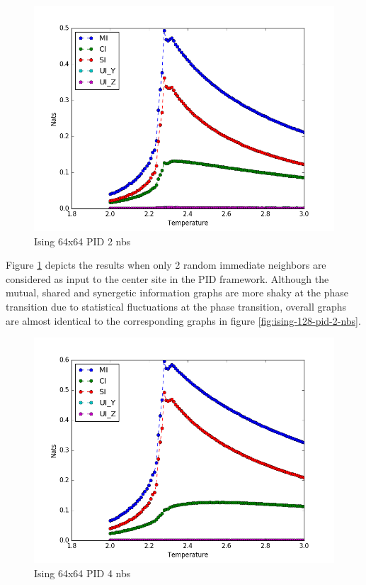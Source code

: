 \documentclass[12pt]{article}
\begin{document}
\begin{figure} [h!]
\begin{center}
\includegraphics[width=\textwidth]{ising-64-pid-2-nbs}
\caption{Ising 64x64 PID 2 nbs}
\label{fig:ising-64-pid-2-nbs}
\end{center}
\end{figure}

Figure \ref{fig:ising-64-pid-2-nbs} depicts the results when only 2 random immediate neighbors are considered as input to the center site in the PID framework. Although the mutual, shared and synergetic information graphs are more shaky at the phase transition due to statistical fluctuations at the phase transition, overall graphs are almost identical to the corresponding graphs in figure \ref{fig:ising-128-pid-2-nbs}. 

\begin{figure} [h!]
\begin{center}
\includegraphics[width=\textwidth]{ising-64-pid-4-nbs}
\caption{Ising 64x64 PID 4 nbs}
\label{fig:ising-64-pid-4-nbs}
\end{center}
\end{figure}
\end{document}
